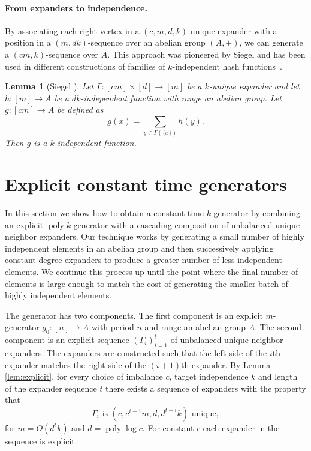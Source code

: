 \documentclass[a4paper,11pt]{article}
\theoremstyle{plain}
\newtheorem{lemma}{Lemma}
\theoremstyle{definition}
\DeclareMathOperator{\poly}{poly}
\begin{document}
\paragraph{From expanders to independence.}
By associating each right vertex in a $(c,m,d,k)$-unique expander with a position in a $(m,dk)$-sequence over an abelian group $(A,+)$, we can generate a $(cm,k)$-sequence over $A$.
This approach was pioneered by Siegel and has been used in different constructions of families of $k$-independent hash functions~\cite{siegel2004, thorup2013}.    
\begin{lemma}[Siegel {\cite[Lemma 2.6, Corollary 2.11]{siegel2004}}] \label{lem:expanderhashing}
Let $\Gamma : [cm] \times [d] \to [m]$ be a $k$-unique expander and let $h : [m] \rightarrow A$ be a $dk$-independent function with range an abelian group. 
Let $g : [cm] \rightarrow A$ be defined as  
\begin{equation}
g(x) = \sum_{y \in \Gamma(\{x\})}h(y).
\end{equation}
Then $g$ is a $k$-independent function.
\end{lemma}
\section{Explicit constant time generators} \label{sec:explicit}
In this section we show how to obtain a constant time \mbox{$k$-generator} by combining an explicit $ \poly k$-generator with a cascading composition of unbalanced unique neighbor expanders. 
Our technique works by generating a small number of highly independent elements in an abelian group and then successively applying constant degree expanders to produce a greater number of less independent elements. 
We continue this process up until the point where the final number of elements is large enough to match the cost of generating the smaller batch of highly independent elements.    

The generator has two components.
The first component is an explicit $m$-generator $g_{0} : [n] \to A$ with period $n$ and range an abelian group $A$.
The second component is an explicit sequence $\left(\Gamma_{i}\right)^{t}_{i = 1}$ of unbalanced unique neighbor expanders.
The expanders are constructed such that the left side of the $i$th expander matches the right side of the $(i+1)$th expander.
By Lemma \ref{lem:explicit}, for every choice of imbalance $c$, target independence $k$ and length of the expander sequence $t$ there exists a sequence of expanders with the property that 
\begin{equation}
\Gamma_{i} \text{ is } (c, c^{i-1}m, d, d^{t-i}k)\text{-unique}, \label{eq:expandersequence}
\end{equation}
for $m = O(d^{t}k)$ and $d = \poly \log c$.
For constant $c$ each expander in the sequence is explicit.
\end{document}
